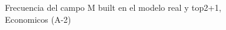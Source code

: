\begin{figure}[H]
    \centering
    
    \caption{Frecuencia del campo M built en el modelo real y top2+1, Economicos (A-2)}
    \label{frecuency-M Built-top2+1}
\end{figure}